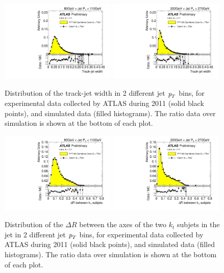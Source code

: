 \begin{figure}[tp]
\centering
\includegraphics[width=0.49\textwidth]{FIGS/dataMC/FullDataVarTrkWidthPT080.pdf}
\includegraphics[width=0.49\textwidth]{FIGS/dataMC/FullDataVarTrkWidthPT200.pdf}  
\caption{ Distribution of the track-jet width in 2 different jet ${\emph{p}_{T}}$ bins, for experimental data  collected by ATLAS during 2011 (solid black points), and simulated data (filled histograms). The ratio data over simulation is shown at the bottom of each plot.}
\label{fig:datamcinputvarsTRKWIDTH}
\end{figure}

\begin{figure}[tp]
\centering
\includegraphics[width=0.49\textwidth]{FIGS/dataMC/FullDataVarDRktaxisPT080.pdf}
\includegraphics[width=0.49\textwidth]{FIGS/dataMC/FullDataVarDRktaxisPT200.pdf}  
\caption{ Distribution of the $\Delta R$ between the axes of the two $k_t$ subjets in the jet in 2 different jet ${\emph{p}_{T}}$ bins, for experimental data  collected by ATLAS during 2011 (solid black points), and simulated data (filled histograms). The ratio data over simulation is shown at the bottom of each plot.}
\label{fig:datamcinputvarsDRKT}
\end{figure}



